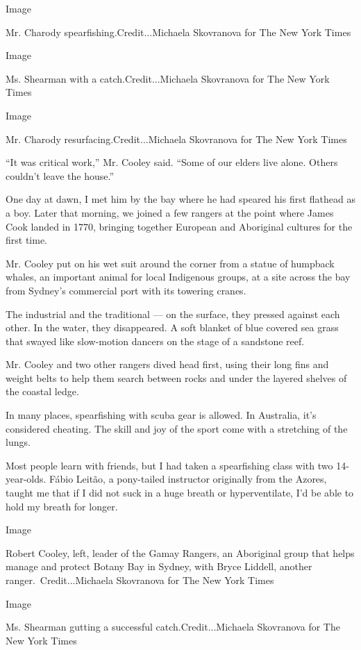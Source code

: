 Image

Mr. Charody spearfishing.Credit...Michaela Skovranova for The New York
Times

Image

Ms. Shearman with a catch.Credit...Michaela Skovranova for The New York
Times

Image

Mr. Charody resurfacing.Credit...Michaela Skovranova for The New York
Times

``It was critical work,'' Mr. Cooley said. ``Some of our elders live
alone. Others couldn't leave the house.''

One day at dawn, I met him by the bay where he had speared his first
flathead as a boy. Later that morning, we joined a few rangers at the
point where James Cook landed in 1770, bringing together European and
Aboriginal cultures for the first time.

Mr. Cooley put on his wet suit around the corner from a statue of
humpback whales, an important animal for local Indigenous groups, at a
site across the bay from Sydney's commercial port with its towering
cranes.

The industrial and the traditional --- on the surface, they pressed
against each other. In the water, they disappeared. A soft blanket of
blue covered sea grass that swayed like slow-motion dancers on the stage
of a sandstone reef.

Mr. Cooley and two other rangers dived head first, using their long fins
and weight belts to help them search between rocks and under the layered
shelves of the coastal ledge.

In many places, spearfishing with scuba gear is allowed. In Australia,
it's considered cheating. The skill and joy of the sport come with a
stretching of the lungs.

Most people learn with friends, but I had taken a spearfishing class
with two 14-year-olds. Fábio Leitão, a pony-tailed instructor originally
from the Azores, taught me that if I did not suck in a huge breath or
hyperventilate, I'd be able to hold my breath for longer.

Image

Robert Cooley, left, leader of the Gamay Rangers, an Aboriginal group
that helps manage and protect Botany Bay in Sydney, with Bryce Liddell,
another ranger.~Credit...Michaela Skovranova for The New York Times

Image

Ms. Shearman gutting a successful catch.Credit...Michaela Skovranova for
The New York Times

